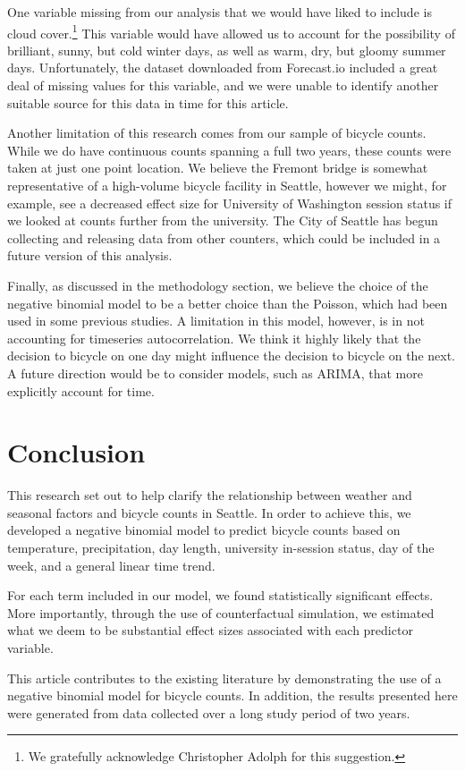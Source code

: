 \documentclass[12pt,letterpaper,article,twocolumn]{memoir}
\begin{document}
One variable missing from our analysis that we would have liked to
include is cloud cover.\footnote{We gratefully acknowledge Christopher
  Adolph for this suggestion.} This variable would have allowed us to
account for the possibility of brilliant, sunny, but cold winter days,
as well as warm, dry, but gloomy summer days. Unfortunately, the
dataset downloaded from Forecast.io included a great deal of missing
values for this variable, and we were unable to identify another
suitable source for this data in time for this article.

Another limitation of this research comes from our sample of bicycle
counts. While we do have continuous counts spanning a full two years,
these counts were taken at just one point location. We believe the
Fremont bridge is somewhat representative of a high-volume bicycle
facility in Seattle, however we might, for example, see a decreased
effect size for University of Washington session status if we looked
at counts further from the university. The City of Seattle has begun
collecting and releasing data from other counters, which could be
included in a future version of this analysis.

Finally, as discussed in the methodology section, we believe the
choice of the negative binomial model to be a better choice than the
Poisson, which had been used in some previous studies. A limitation in
this model, however, is in not accounting for timeseries
autocorrelation. We think it highly likely that the decision to
bicycle on one day might influence the decision to bicycle on the
next. A future direction would be to consider models, such as ARIMA,
that more explicitly account for time.

\section*{Conclusion}
This research set out to help clarify the relationship between weather
and seasonal factors and bicycle counts in Seattle. In order to
achieve this, we developed a negative binomial model to predict
bicycle counts based on temperature, precipitation, day length,
university in-session status, day of the week, and a general linear
time trend.

For each term included in our model, we found statistically
significant effects. More importantly, through the use of
counterfactual simulation, we estimated what we deem to be substantial
effect sizes associated with each predictor variable.

This article contributes to the existing literature by demonstrating
the use of a negative binomial model for bicycle counts. In addition,
the results presented here were generated from data collected over a
long study period of two years.
\end{document}
